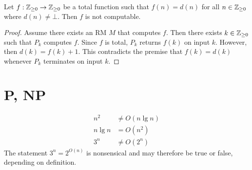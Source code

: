 \documentclass{article}
\begin{document}
\begin{claim*}[c]
    Let $f:\mathbb{Z}_{\geq 0}\to\mathbb{Z}_{\geq 0}$ be a total function such that $f(n)=d(n)$ for all $n\in\mathbb{Z}_{\geq 0}$ where 
    $d(n)\not=\bot$. Then $f$ is not computable.
    \begin{proof}
        Assume there exists an RM $M$ that computes $f$. Then there exists $k\in\mathbb{Z}_{\geq 0}$ such that 
        $P_k$ computes $f$. Since $f$ is total, $P_k$ returns $f(k)$ on input $k$. However,
        then $d(k)=f(k)+1$. This contradicts the premise that $f(k)=d(k)$ whenever $P_k$ terminates 
        on input $k$.
    \end{proof}
\end{claim*}

\section{P, NP}

\begin{claim*}[a]
    \begin{align}
        \label{on2}
        n^2&\not=O(n\lg n)\\
        \label{onlgn}
        n\lg n &=O(n^2)\\
        \label{o3n}
        3^n&\not=O(2^n)
    \end{align}
    The statement $3^n=2^{O(n)}$ is nonsensical and may therefore be true or false, depending on 
    definition.
\end{claim*}
\end{document}
